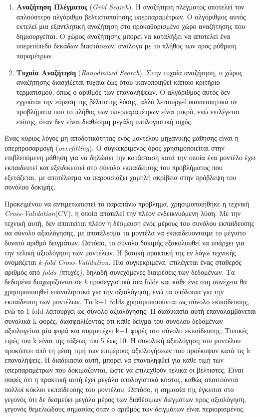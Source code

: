 \documentclass[diploma]{softlab-thesis}
\begin{document}
\begin{enumerate}
\begin{enumerate}
\begin{enumerate}
\item \textbf{Αναζήτηση Πλέγματος} (\textit{Grid Search}). Η αναζήτηση πλέγματος αποτελεί τον απλούστερο αλγόριθμο βελτιστοποίησης υπερπαραμέτρων. Ο αλγόριθμος αυτός εκτελεί μια εξαντλητική αναζήτηση στο προκαθορισμένο χώρο αναζήτησης που δημιουργείται. Ο χώρος αναζήτησης μπορεί να καταλήξει να αποτελεί ένα υπερεπίπεδο δεκάδων διαστάσεων, ανάλογα με το πλήθος των προς ρύθμιση παραμέτρων. 
\item \textbf{Τυχαία Αναζήτηση} (\textit{Ranodmized Search}). Στην τυχαία αναζήτηση, ο χώρος αναζήτησης διασχίζεται τυχαία έως ότου ικανοποιηθεί κάποιο κριτήριο τερματισμού, όπως ο αριθμός των επαναλήψεων. Ο αλγόριθμος αυτός δεν εγγυάται την εύρεση της βέλτιστης λύσης, αλλά λειτουργεί ικανοποιητικά σε προβλήματα που το πλήθος των υπερπαραμέτρων είναι μικρό, ενώ επιλέγεται επίσης, όταν δεν είναι διαθέσιμη μεγάλη υπολογιστική ισχύς.
\end{enumerate}

Ένας κύριος λόγος μη αποδοτικότητας ενός μοντέλου μηχανικής μάθησης είναι η υπερπροσαρμογή (\textit{overfitting}). Ο συγκεκριμένος όρος χρησιμοποιείται στην επιβλεπόμενη μάθηση για να δηλώσει την κατάσταση κατά την οποία ένα μοντέλο έχει εκπαιδευτεί και εξειδικευτεί στο σύνολο εκπαίδευσης του προβλήματος που εξετάζεται, με αποτέλεσμα να παρουσιάζει χαμηλή ακρίβεια στην πρόβλεψη του συνόλου δοκιμής. 

Προκειμένου να αντιμετωπιστεί το παραπάνω πρόβλημα, χρησιμοποιήθηκε η τεχνική \textit{Cross-Validation}(CV), η οποία αποτελεί την πλέον ενδεικνυόμενη λύση. Με την τεχνική αυτή, δεν απαιτείται πλέον η δέσμευση ενός μέρους του συνόλου εκπαίδευσης σα σύνολο αξιολόγησης, με αποτέλεσμα τα μοντέλα να εκπαιδεύονταιμε το μέγιστο δυνατό αριθμό δειγμάτων. Ωστόσο, το σύνολο δοκιμής εξακολουθεί να υπάρχει για την τελική αξιολόγηση των μοντέλων. Η βασική πρακτική της εν λόγω τεχνικής ονομάζεται \textit{k-fold Cross-Validation}. Πιο συγκεκριμένα, επιλέγεται ένας σταθερός αριθμός από \textit{folds (πτυχές)}, δηλαδή συνεχόμενες διαιρέσεις των δεδομένων. Τα δεδομένα διαχωρίζονται σε \textit{k} προσεγγιστικά ίσα folds και κάθε ένα στη συνέχεια θα χρησιμοποιηθεί επαναληπτικά για την αξιολόγηση, ενώ τα υπόλοιπα για την εκπαίδευση των μοντέλων. Τα k−1 folds χρησιμοποιούνται ως σύνολο εκπαίδευσης, ενώ το 1 fold λειτουργεί ως σύνολο αξιολόγησης. Η διαδικασία αυτή επαναλαμβάνεται συνολικά  k φορές, διασφαλίζοντας ότι κάθε δείγμα του συνόλου δεδομένων αξιολογείται μία φορά και συμμετέχει k−1 φορές στο σύνολο εκπαίδευσης. Τυπικές τιμές του k είναι της τάξεως του 5 έως 10. Η συνολική αξιολόγηση του μοντέλου προκύπτει από τη μέση τιμή των επιμέρους αξιολογήσεων που προέκυψαν κατά τις k επαναλήψεις. Η διαδικασία αυτή, μπορεί να επαναληφθεί για κάθε τιμή των υπερπαραμέτρων που δοκιμάζονται, ώστε να επιλεχθούν τελικά οι βέλτιστες. Είναι σαφές ότι η πρακτική αυτή έχει μεγάλο υπολογιστικό κόστος, καθώς απαιτούνται πολλοί κύκλοι εκπαίδευσης του μοντέλου. Ωστόσο, η σημασία της έγκειται στο γεγονός ότι δε δεσμεύει μεγάλο μέρος των διαθέσιμων διεγμάτων προς αξιολόγηση, γεγονός θεμελιώδους σημασίας όταν ο αριθμός των δειγμάτων είναι περιορισμένος. 


\end{enumerate}
\end{enumerate}
\end{document}
